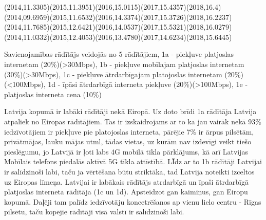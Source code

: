 {}
    {(2014,11.3305)(2015,11.3951)(2016,15.0115)(2017,15.4357)(2018,16.4)}
    {(2014,09.6959)(2015,11.6532)(2016,14.3374)(2017,15.3726)(2018,16.2237)}
    {(2014,11.7685)(2015,12.6421)(2016,14.0537)(2017,15.5321)(2018,16.0279)}
    {(2014,11.0332)(2015,12.4053)(2016,13.4780)(2017,14.6234)(2018,15.6445)}

Savienojamības rādītājs veidojās no 5 rādītājiem, 1a - piekļuve platjoslas internetam (20\%)(>30Mbps),
1b - piekļuve mobīlajam platjoslas internetam (30\%)(>30Mbps), 1c - piekļuve ātrdarbīgajam platojoslas internetam (20\%)(<100Mbps),
1d - īpāsi ātrdarbīgā interneta piekļuve (20\%)(>100Mbps), 1e - platjoslas interneta cena (10\%)
\par
Latvija kopumā ir labāki rādītāji nekā Eiropā. Uz doto brīdi 1a rādītāja Latvija atpaliek
no Eiropas rādītājiem. Tas ir izskaidrojams ar to ka jau vairāk nekā 93\% iedzīvotājiem
ir piekļuve pie platojoslas interneta, pārējie 7\% ir ārpus pilsētām, privātmājas, lauku mājas utml,
tādas vietas, uz kurām nav izdevīgi veikt tiešo pieslēgumu, jo Latvijā ir ļoti labs
4G mobilā tīkla pārklājums, kā arī Latvijas Mobīlais telefons piedalās aktīvā 5G tīkla
attīstībā. LĪdz ar to 1b rādītāji Latvijai ir salīdzinoši labi, taču ja vērtēšana būtu
striktāka, tad Latvija noteikti izceltos uz Eiropas līmeņa. Latvijai ir labākais rādītājs
atrdarbīgā un īpaši ātrdarbīgā platjoslas interneta rādītāja (1c un 1d). Apsteidzot gan kaimiņus,
gan Eiropu kopumā. Daļēji tam palīdz iedzīvotāju koncetrēšanos ap vienu lielo centru - 
Rīgas pilsētu, taču kopējie rādītāji visā valstī ir salīdzinoši labi.


